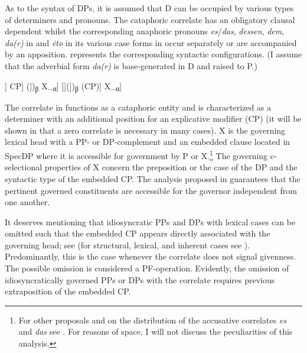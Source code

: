 \documentclass[output=paper]{langscibook}
\begin{document}
As to the syntax of DPs, it is assumed that D can be occupied by various types of determiners and pronouns. The cataphoric correlate has an obligatory clausal dependent whilst the corresponding anaphoric pronouns \textit{es}/\textit{das}, \textit{dessen}, \textit{dem}, \textit{da(r)} in  and \textit{ėto} in its various case forms in  occur separately or are accompanied by an apposition.  represents the corresponding syntactic configurations. (I assume that the  adverbial form \textit{da(r)} is base-generated in D and raised to P.)

\ea\label{ex:zimmermann:7}
    \ea\label{ex:zimmermann:7a}
    \Big[\textsubscript{XP} X\textsubscript{α} (\big[\textsubscript{PP} P)\textsubscript{β} [\textsubscript{DP} [\textsubscript{D$'$} [\textsubscript{D} \big\{\{\textit{es}/\textit{das}\}, \textit{to}, $\varnothing$\big\}]] CP] (\big])\textsubscript{β} X\textsubscript{$-$α}\Big]
    \ex\label{ex:zimmermann:7b} \Big[\textsubscript{XP} X\textsubscript{α} (\big[\textsubscript{PP} P)\textsubscript{β} [\textsubscript{DP} [\textsubscript{DP} [\textsubscript{D$'$} [\textsubscript{D} \big\{\{\textit{es}/\textit{das}\}, \textit{ėto}\big\}]]](])\textsubscript{β} (CP)\big] X\textsubscript{$-$α}\Big]
\z\z

\noindent The correlate in  functions as a cataphoric entity and is characterized as a determiner with an additional position for an explicative modifier (CP) (it will be shown in  that a zero correlate is necessary in many cases).
X is the governing lexical head with a PP- or DP-complement and an embedded clause located in SpecDP where it is accessible for government by P or X.\footnote{For other proposals and on the distribution of the accusative correlates \textit{es} and \textit{das} see \citet{Axel-ToberHollerKrause2016}. For reasons of space, I will not discuss the peculiarities of this analysis.} The governing c-selectional properties of X concern the preposition or the case of the DP and the syntactic type of the embedded CP. The analysis proposed in  guarantees that the pertinent governed constituents are accessible for the governor independent from one another.

It deserves mentioning that idiosyncratic PPs and DPs with lexical cases can be omitted such that the embedded CP appears directly associated with the governing head; see  (for structural, lexical, and inherent cases see \citealt{SmirnovaJackendoff2017}). Predominantly, this is the case whenever the correlate does not signal givenness. The possible omission is considered a PF-operation. Evidently, the omission of idiosyncratically governed PPs or DPs with the correlate requires previous extraposition of the embedded CP.
\end{document}
